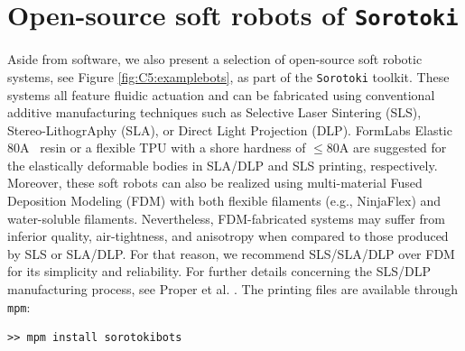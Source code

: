 \section{Open-source soft robots of \texttt{Sorotoki}}
Aside from software, we also present a selection of open-source soft robotic systems,  see Figure \ref{fig:C5:examplebots}, as part of the \texttt{Sorotoki} toolkit. These systems all feature fluidic actuation and can be fabricated using conventional additive manufacturing techniques such as Selective Laser Sintering (SLS), Stereo-LithogrAphy (SLA), or Direct Light Projection (DLP). FormLabs Elastic 80A\texttrademark
\, resin or a flexible TPU with a shore hardness of $\le 80$A are suggested for the elastically deformable bodies in SLA/DLP and SLS printing, respectively. Moreover, these soft robots can also be realized using multi-material Fused Deposition Modeling (FDM) with both flexible filaments (e.g., NinjaFlex) and water-soluble filaments. Nevertheless, FDM-fabricated systems may suffer from inferior quality, air-tightness, and anisotropy when compared to those produced by SLS or SLA/DLP. For that reason, we recommend SLS/SLA/DLP over FDM for its simplicity and reliability. For further details concerning the SLS/DLP manufacturing process, see Proper et al. \cite{Proper2023}. The printing files are available through \texttt{mpm}:

\vspace{3mm}
\begin{lstlisting}[style=Matlabterminal]
>> mpm install sorotokibots
\end{lstlisting}
%
\clearpage

